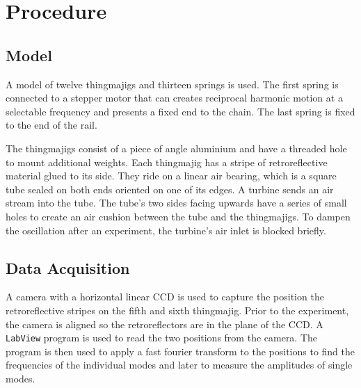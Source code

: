 \chapter{Procedure}
\section{Model}
A model of twelve thingmajigs and thirteen springs is used.
The first spring is connected to a stepper motor that can creates reciprocal harmonic motion at a selectable frequency and presents a fixed end to the chain.
The last spring is fixed to the end of the rail.

The thingmajigs consist of a piece of angle aluminium and have a threaded hole to mount additional weights.
Each thingmajig has a stripe of retroreflective material glued to its side.
They ride on a linear air bearing, which is a square tube sealed on both ends oriented on one of its edges.
A turbine sends an air stream into the tube.
The tube's two sides facing upwards have a series of small holes to create an air cushion between the tube and the thingmajigs.
To dampen the oscillation after an experiment, the turbine's air inlet is blocked briefly.

\section{Data Acquisition}\label{sec:data_acq}
A camera with a horizontal linear CCD is used to capture the position the retroreflective stripes on the fifth and sixth thingmajig.
Prior to the experiment, the camera is aligned so the retroreflectors are in the plane of the CCD.
A \texttt{LabView} program is used to read the two positions from the camera.
The program is then used to apply a fast fourier transform to the positions to find the frequencies of the individual modes and later to measure the amplitudes of single modes.
